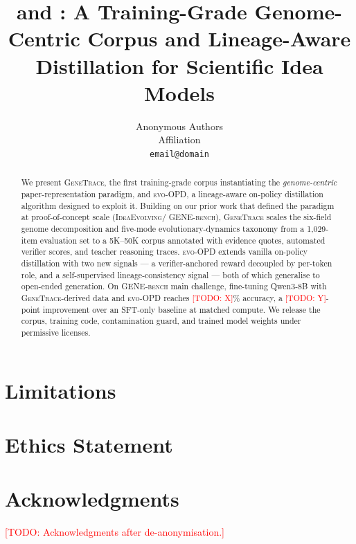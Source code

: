 \documentclass[11pt]{article}
\title{\genetrace{} and \evoopd{}: A Training-Grade Genome-Centric Corpus and Lineage-Aware Distillation for Scientific Idea Models}
\author{Anonymous Authors \\
  Affiliation \\
  \texttt{email@domain} \\}
\newcommand{\genetrace}{\textsc{GeneTrace}}
\newcommand{\evoopd}{\textsc{evo-OPD}}
\newcommand{\geneexam}{\textsc{GENE-bench}}
\newcommand{\ideaevolving}{\textsc{IdeaEvolving}}
\newcommand{\todo}[1]{\textcolor{red}{[TODO: #1]}}
\begin{document}
\maketitle

\begin{abstract}
We present \genetrace, the first training-grade corpus instantiating the
\emph{genome-centric} paper-representation paradigm, and \evoopd, a
lineage-aware on-policy distillation algorithm designed to exploit it.
Building on our prior work that defined the paradigm at proof-of-concept
scale (\ideaevolving / \geneexam), \genetrace{} scales the six-field
genome decomposition and five-mode evolutionary-dynamics taxonomy from a
1{,}029-item evaluation set to a 5K--50K corpus annotated with evidence
quotes, automated verifier scores, and teacher reasoning traces. \evoopd{}
extends vanilla on-policy distillation with two new signals --- a
verifier-anchored reward decoupled by per-token role, and a self-supervised
lineage-consistency signal --- both of which generalise to open-ended
generation. On \geneexam{} main challenge, fine-tuning Qwen3-8B with
\genetrace-derived data and \evoopd{} reaches \todo{X}\% accuracy, a
\todo{Y}-point improvement over an SFT-only baseline at matched compute.
We release the corpus, training code, contamination guard, and trained
model weights under permissive licenses.
\end{abstract}








\section*{Limitations}


\section*{Ethics Statement}


\section*{Acknowledgments}
\todo{Acknowledgments after de-anonymisation.}



\appendix

\end{document}
